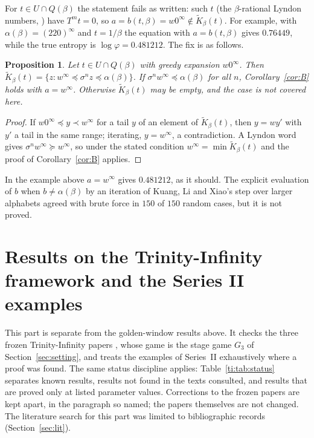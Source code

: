 \documentclass[11pt]{amsart}
\newtheorem{proposition}[theorem]{Proposition}
\theoremstyle{remark}
\newcommand{\lex}{\preccurlyeq}
\begin{document}
For $t\in U\cap Q(\beta)$ the statement fails as written: such $t$ (the $\beta$-rational Lyndon numbers, \cite[Remark~3.5]{KLX}) have $T^mt=0$, so $a=b(t,\beta)=w0^\infty\notin\tilde K_\beta(t)$. For example, with $\alpha(\beta)=(220)^\infty$ and $t=1/\beta$ the equation with $a=b(t,\beta)$ gives $0.76449$, while the true entropy is $\log\varphi=0.481212$. The fix is as follows.

\begin{proposition}\label{prop:rat}
Let $t\in U\cap Q(\beta)$ with greedy expansion $w0^\infty$. Then $\tilde K_\beta(t)=\{z:w^\infty\lex\sigma^nz\lex\alpha(\beta)\}$. If $\sigma^nw^\infty\lex\alpha(\beta)$ for all $n$, Corollary~\ref{cor:B} holds with $a=w^\infty$. Otherwise $\tilde K_\beta(t)$ may be empty, and the case is not covered here.
\end{proposition}

\begin{proof}
If $w0^\infty\lex y\prec w^\infty$ for a tail $y$ of an element of $\tilde K_\beta(t)$, then $y=wy'$ with $y'$ a tail in the same range; iterating, $y=w^\infty$, a contradiction. A Lyndon word gives $\sigma^nw^\infty\succcurlyeq w^\infty$, so under the stated condition $w^\infty=\min\tilde K_\beta(t)$ and the proof of Corollary~\ref{cor:B} applies.
\end{proof}

In the example above $a=w^\infty$ gives $0.481212$, as it should. The explicit evaluation of $b$ when $b\ne\alpha(\beta)$ by an iteration of Kuang, Li and Xiao's step over larger alphabets agreed with brute force in $150$ of $150$ random cases, but it is not proved.

\section{Results on the Trinity-Infinity framework and the Series II examples}\label{sec:trinity}

This part is separate from the golden-window results above. It checks the three frozen
Trinity-Infinity papers \cite{SeriesI,SeriesII,SeriesIII}, whose game is the stage game $G_3$ of
Section~\ref{sec:setting}, and treats the examples of Series~II exhaustively where a proof was found.
The same status discipline applies: Table~\ref{ti:tab:status} separates known results, results not
found in the texts consulted, and results that are proved only at listed parameter values.
Corrections to the frozen papers are kept apart, in the paragraph so named; the papers themselves
are not changed. The literature search for this part was limited to bibliographic records
(Section~\ref{sec:lit}).
\end{document}
